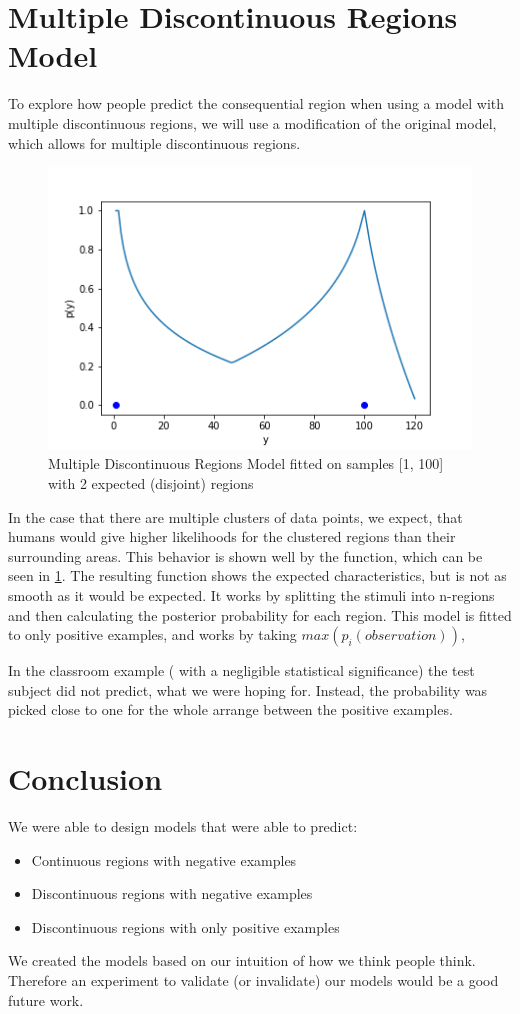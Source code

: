 \documentclass[12pt, ]{scrartcl}
\begin{document}
\begin{multicols}{2}
\section{Multiple Discontinuous Regions Model}
To explore how people predict the consequential region when using a model with multiple discontinuous regions, we will use
a modification of the original model, which allows for multiple discontinuous regions.
\begin{figure}[H]
	\centering
	\includegraphics[scale=0.5]{graphics/mprm_model}
	\caption{Multiple Discontinuous Regions Model fitted on samples [1, 100] with 2 expected (disjoint) regions}
	\label{fig:mprm}
\end{figure}
In the case that there are multiple clusters of data points, we expect, that humans would  give higher likelihoods for the clustered regions than their surrounding areas. 
This behavior is shown well by the function, which can be seen in \cref{fig:mprm}. The resulting function shows the expected characteristics, but is not as smooth as it would be expected.
It works by splitting the stimuli into n-regions and then calculating the posterior probability for each region.
This model is fitted to only positive examples, and works by taking $max(p_i(observation))$, 


In the classroom example ( with a negligible statistical significance) the test subject did not predict, what we were hoping for. Instead, the probability was picked close to one for the whole arrange between the positive examples.  
\section{Conclusion}

We were able to design models that were able to predict:
\begin{itemize}
	\item Continuous regions with negative examples
	\item Discontinuous regions with negative examples
	\item Discontinuous regions with only positive examples 
\end{itemize}

We created the models based on our intuition of how we think people think. Therefore an experiment to validate (or invalidate) our models would be a good future work.


\printbibliography

\if {}
\end{multicols}
\end{document}
